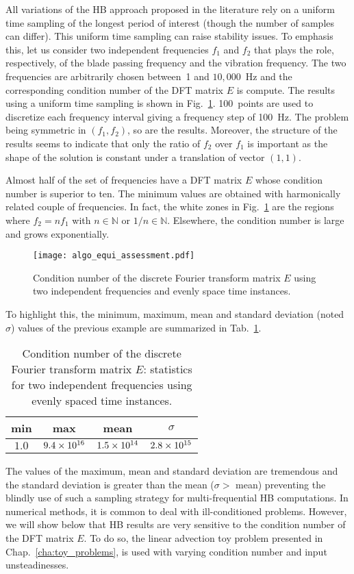 All variations of the HB approach proposed in the literature rely on 
a uniform time sampling of the longest period of interest 
(though the number of samples can differ). 
This uniform time sampling can raise stability issues.
To emphasis this, let us consider two independent frequencies $f_1$
and $f_2$ that plays the role, respectively, of the blade passing frequency and
the vibration frequency. The two frequencies are arbitrarily chosen between~1
and $10,000$~Hz and the corresponding
condition number of the DFT matrix $E$ is compute. The results using a uniform time
sampling is shown in Fig.~\ref{fig:algo_equi_assessment}.
100~points are used to discretize each frequency interval giving a frequency step
of 100~Hz.
The problem being symmetric in $(f_1, f_2)$, so are the results.
Moreover, the structure of the results seems to indicate that only the
ratio of $f_2$ over $f_1$ is important as the shape of the
solution is constant under a translation of vector $(1,1)$.

Almost half of the set of frequencies have a DFT matrix $E$
whose condition number is superior to ten.
The minimum values are obtained with harmonically related couple
of frequencies. In fact, the white zones in Fig.~\ref{fig:algo_equi_assessment}
are the regions where $f_2 = n f_1$ with $n \in \mathbb{N}$ or $1/n \in \mathbb{N}$.
Elsewhere, the condition number is large and grows exponentially.
\begin{figure}[htp]
  \centering
  \texttt{[image: algo\_equi\_assessment.pdf]}
  \caption{Condition number of the discrete Fourier transform matrix $E$
  using two independent frequencies and evenly space time instances.}
  \label{fig:algo_equi_assessment}
\end{figure}
To highlight this, the minimum, maximum, mean and 
standard deviation (noted $\sigma$) values of the
previous example are summarized in Tab.~\ref{tab:hb_algo_equi}.
\begin{table}
  \centering
  \begin{tabular}{cccc}
    \toprule
    min & max & mean & $\sigma$ \\
    \midrule
    $1.0$ & $9.4\times 10^{16}$ & $1.5\times 10^{14}$ & $2.8\times 10^{15}$ \\
    \bottomrule
  \end{tabular}
  \caption{Condition number of the discrete Fourier transform matrix $E$: 
  statistics for two independent frequencies using evenly spaced time instances.}
  \label{tab:hb_algo_equi}
\end{table}  
The values of the maximum, mean and standard deviation are tremendous
and the standard deviation is greater than the mean
($\sigma > $ mean) preventing the blindly use of such a sampling strategy for 
multi-frequential HB computations.
In numerical methods, it is common to deal with ill-conditioned
problems. However, we will show below that HB results are 
very sensitive to the condition number of the DFT matrix $E$.
To do so, the linear advection toy problem
presented in Chap.~\ref{cha:toy_problems},
is used with varying condition number and input unsteadinesses.
